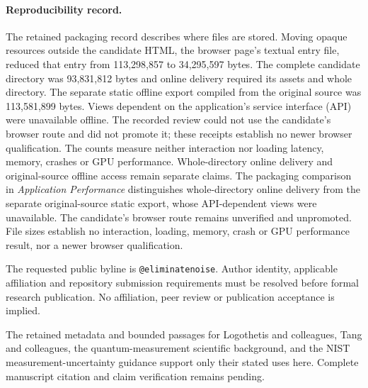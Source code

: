 \paragraph{Reproducibility record.}
The retained packaging record describes where files are stored. Moving opaque
resources outside the candidate HTML, the browser page's textual entry file,
reduced that entry from 113,298,857 to 34,295,597 bytes. The complete candidate
directory was 93,831,812 bytes and online delivery required its assets and whole
directory. The separate static offline export compiled from the original source
was 113,581,899 bytes. Views dependent on the application's service interface
(API) were unavailable offline. The recorded review could not use the
candidate's browser route and did not promote it; these receipts establish no
newer browser qualification. The counts measure neither interaction nor loading
latency, memory, crashes or GPU performance. Whole-directory online delivery and
original-source offline access remain separate claims.
\else
The packaging comparison in \textit{Application Performance} distinguishes
whole-directory online delivery from the separate original-source static export,
whose API-dependent views were unavailable. The candidate's browser route remains
unverified and unpromoted. File sizes establish no interaction, loading, memory,
crash or GPU performance result, nor a newer browser qualification.
\fi

The requested public byline is \texttt{@eliminatenoise}. Author identity,
applicable affiliation and repository submission requirements must be resolved
before formal research publication. No affiliation, peer review or publication acceptance is implied.

The retained metadata and bounded passages for Logothetis and colleagues,
Tang and colleagues, the quantum-measurement scientific background, and the
NIST measurement-uncertainty guidance support only their stated uses here.
Complete manuscript citation and claim verification remains pending.
